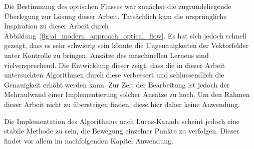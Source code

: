 Die Bestimmung des optischen Flusses war zunächst die zugrundeliegende Überlegung zur Lösung dieser Arbeit.
Tatsächlich kam die ursprüngliche Inspiration zu dieser Arbeit durch  Abbildung~\ref{fig:ai_modern_approach_optical_flow}.
Es hat sich jedoch schnell gezeigt, dass es sehr schwierig sein könnte die Ungenauigkeiten der Vektorfelder unter Kontrolle zu bringen.
Ansätze des maschinellen Lernens sind vielversprechend.
Die Entwicklung dieser zeigt, dass die in dieser Arbeit untersuchten Algorithmen durch diese verbessert und schlussendlich die Genauigkeit erhöht werden kann.
Zur Zeit der Bearbeitung ist jedoch der Mehraufwand einer Implementierung solcher Ansätze zu hoch.
Um den Rahmen dieser Arbeit nicht zu übersteigen finden, diese hier daher keine Anwendung.

Die Implementation des Algorithmus nach Lucas-Kanade scheint jedoch eine stabile Methode zu sein, die Bewegung einzelner Punkte zu verfolgen.
Dieser findet vor allem im nachfolgenden Kapitel Anwendung.
